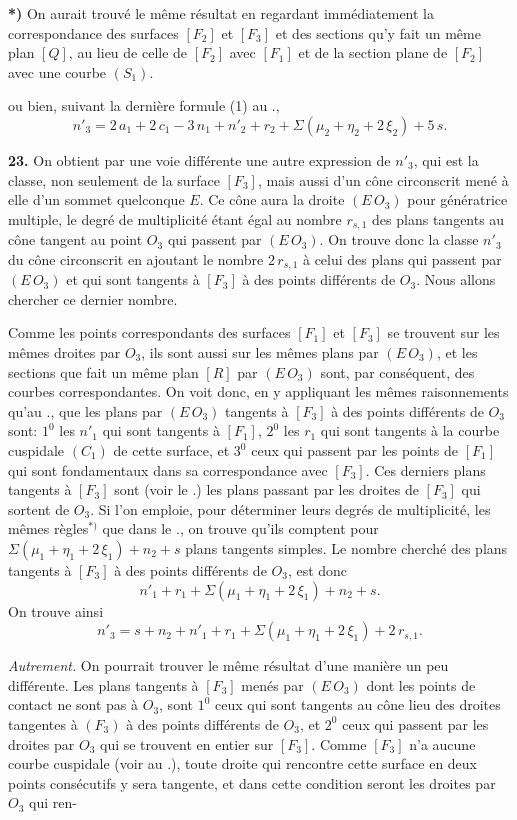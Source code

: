 \documentclass{article}
\begin{document}
\textbf{*)} On aurait trouvé le même résultat en regardant immédiatement la correspondance des surfaces $[F_2]$ et $[F_3]$ et des sections qu'y fait un même plan $[Q]$, au lieu de celle de $[F_2]$ avec $[F_1]$ et de la section plane de $[F_2]$ avec une courbe $(S_1)$.

ou bien, suivant la dernière formule (1) au .,
\[
n'_3 = 2\,a_1 + 2\,c_1 - 3\,n_1 + n'_2 + r_2 + \Sigma(\mu_2 + \eta_2 + 2\,\xi_2) + 5\,s. \tag{$6_c$}
\]

\textbf{23.} On obtient par une voie différente une autre expression de $n'_3$, qui est la classe, non seulement de la surface $[F_3]$, mais aussi d'un cône circonscrit mené à elle d'un sommet quelconque $E$. Ce cône aura la droite $(E\,O_3)$ pour génératrice multiple, le degré de multiplicité étant égal au nombre $r_{s, 1}$ des plans tangents au cône tangent au point $O_3$ qui passent par $(E\,O_3)$. On trouve donc la classe $n'_3$ du cône circonscrit en ajoutant le nombre $2\,r_{s, 1}$ à celui des plans qui passent par $(E\,O_3)$ et qui sont tangents à $[F_3]$ à des points différents de $O_3$. Nous allons chercher ce dernier nombre.

Comme les points correspondants des surfaces $[F_1]$ et $[F_3]$ se trouvent sur les mêmes droites par $O_3$, ils sont aussi sur les mêmes plans par $(E\,O_3)$, et les sections que fait un même plan $[R]$ par $(E\,O_3)$ sont, par conséquent, des courbes correspondantes. On voit donc, en y appliquant les mêmes raisonnements qu'au ., que les plans par $(E\,O_3)$ tangents à $[F_3]$ à des points différents de $O_3$ sont: $1^0$ les $n'_1$ qui sont tangents à $[F_1]$, $2^0$ les $r_1$ qui sont tangents à la courbe cuspidale $(C_1)$ de cette surface, et $3^0$ ceux qui passent par les points de $[F_1]$ qui sont fondamentaux dans sa correspondance avec $[F_3]$. Ces derniers plans tangents à $[F_3]$ sont (voir le .) les plans passant par les droites de $[F_3]$ qui sortent de $O_3$. Si l'on emploie, pour déterminer leurs degrés de multiplicité, les mêmes règles${}^{*)}$ que dans le ., on trouve qu'ils comptent pour $\Sigma(\mu_1 + \eta_1 + 2\,\xi_1) + n_2 + s$ plans tangents simples. Le nombre cherché des plans tangents à $[F_3]$ à des points différents de $O_3$, est donc
\[
n'_1 + r_1 + \Sigma(\mu_1 + \eta_1 + 2\,\xi_1) + n_2 + s.
\]
On trouve ainsi
\[
n'_3 = s + n_2 + n'_1 + r_1 + \Sigma(\mu_1 + \eta_1 + 2\,\xi_1) + 2\,r_{s, 1}. \tag{7}
\]

\emph{Autrement.} On pourrait trouver le même résultat d'une manière un peu différente. Les plans tangents à $[F_3]$ menés par $(E\,O_3)$ dont les points de contact ne sont pas à $O_3$, sont $1^0$ ceux qui sont tangents au cône lieu des droites tangentes à $(F_3)$ à des points différents de $O_3$, et $2^0$ ceux qui passent par les droites par $O_3$ qui se trouvent en entier sur $[F_3]$. Comme $[F_3]$ n'a aucune courbe cuspidale (voir au .), toute droite qui rencontre cette surface en deux points consécutifs y sera tangente, et dans cette condition seront les droites par $O_3$ qui ren-
\end{document}
